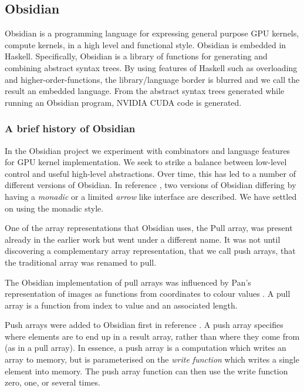 \subsection{Obsidian} 
\label{sec:Obsidian} 

Obsidian is a programming language for expressing general purpose 
GPU kernels, compute kernels, in a high level and functional style.  
Obsidian is embedded in Haskell.
Specifically, Obsidian is a library of functions for generating 
and combining abstract syntax trees.
By using features of Haskell such as overloading and higher-order-functions, 
the library/language border is blurred and we call the result an embedded 
language. From the abstract syntax trees generated while running an 
Obsidian program, NVIDIA CUDA code is generated. 


\subsubsection{A brief history of Obsidian} 
\label{sec:OBSHist}

In the Obsidian project we experiment with combinators and language 
features for GPU kernel implementation. We seek to strike a balance 
between low-level control and useful high-level abstractions. Over time, this 
has led to a number of different versions of Obsidian. In reference \cite{JSLIC}, 
two versions of Obsidian differing by having a {\em monadic} or a limited {\em arrow} 
like interface are described. We have settled on using the monadic style. 

One of the array representations that Obsidian uses, the Pull array, was present already 
in the earlier work but went under a different name. It was not until discovering 
a complementary array representation, that we call push arrays, that the traditional 
array was renamed to pull. 

The Obsidian implementation of pull arrays was influenced by Pan's representation 
of images as functions from coordinates to colour values \cite{ELLIJFP}. A pull array 
is a function from index to value and an associated length.  

Push arrays were added to Obsidian first in reference \cite{PUSH}. A push array
specifies where elements are to end up in a result array, rather than where 
they come from (as in a pull array). In essence, a push array is a
computation which writes an array to memory, but is parameterised on
the {\em write function} which writes a single element into memory.
The push array function can then 
use the write function zero, one, or several times. 

